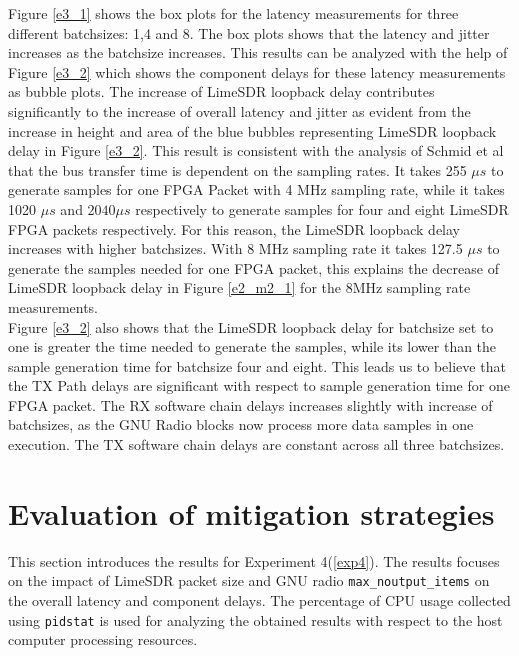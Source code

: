 Figure \ref{e3_1} shows the box plots for the latency measurements for three different batchsizes: 1,4 and 8. 
The box plots shows that the latency and jitter increases as the batchsize increases.
This results can be analyzed with the help of Figure \ref{e3_2} which shows the component delays for these latency measurements as bubble plots.
The increase of LimeSDR loopback delay contributes significantly to the increase of overall latency and jitter as evident from the increase in height and area of the blue bubbles representing LimeSDR loopback delay in Figure \ref{e3_2}.
This result is consistent with the analysis of Schmid et al \cite{schmid_experimental_2007} that the bus transfer time is dependent on the sampling rates.
It takes  255 $\mu s$ to generate samples for one FPGA Packet with 4 MHz sampling rate, while it takes 1020 $\mu s$ and $2040 \mu s$ respectively to generate samples for four and eight LimeSDR FPGA packets respectively.
For this reason, the LimeSDR loopback delay increases with higher batchsizes.
With 8 MHz sampling rate it takes 127.5 $\mu s$ to generate the samples needed for one FPGA packet, this explains the decrease of LimeSDR loopback delay in Figure \ref{e2_m2_1} for the 8MHz sampling rate measurements.\\

Figure \ref{e3_2} also shows that the LimeSDR loopback delay for batchsize set to one is greater the time needed to generate the samples, while its lower than the sample generation time for batchsize four and eight.
This leads us to believe that the TX Path delays are significant with respect to sample generation time for one FPGA packet.
The RX software chain delays increases slightly with increase of batchsizes, as the GNU Radio blocks now process more data samples in one execution.
The TX software chain delays are constant across all three batchsizes.\\

\section{Evaluation of mitigation strategies}
This section introduces the results for Experiment 4(\ref{exp4}).
The results focuses on the impact of LimeSDR packet size and GNU radio \texttt{max\_noutput\_items} on the overall latency and component delays.
The percentage of CPU usage collected using \texttt{pidstat} is used for analyzing the obtained results with respect to the host computer processing resources.\\

